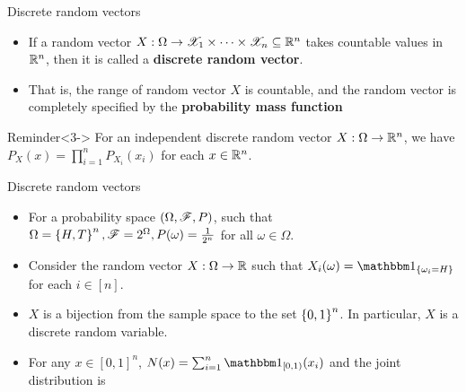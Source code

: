 \documentclass[12pt,aspectratio=169]{beamer}
\begin{document}
\begin{frame}{Discrete random vectors}
\begin{Definition}
\begin{itemize}
    \item <1-> If a random vector $X: \Omega \to \mathscr{X}_1 \times \dots  \times \mathscr{X}_n    \subseteq \mathbb{R}^n$ 
        takes countable values in $\mathbb{R}^n$, 
        then it is called a \textbf{discrete random vector}.
    \item <2-> That is, the range of random vector $X$ is countable,
        and the random vector is completely specified by the \textbf{probability mass function}
\end{itemize}
\end{Definition}
\begin{block}{Reminder}<3->
For an independent discrete random vector $X: \Omega \to \mathbb{R}^n$, we have $P_X(x) = \prod_{i=1}^nP_{X_i}(x_i)$ for each $x \in \mathbb{R}^n$. 
\end{block}
\end{frame}
\begin{frame}{Discrete random vectors}
\begin{Example} 
\begin{itemize}
\item <1-> For a probability space $(\Omega, \mathscr{F}, P)$, such that $\Omega = \left\{H,T\right\}^n, \mathscr{F} = 2^\Omega, P(\omega) = \frac{1}{2^n}$ for all $\omega \in \Omega$.  
\item <2-> Consider the random vector $X: \Omega \to \mathbb{R}$ such that $X_i(\omega) = \SetIn{\omega_i = H}$ for each $i \in [n]$. 
\item <3-> $X$ is a bijection from the sample space to the set $\left\{0,1\right\}^n$. 
In particular, $X$ is a discrete random variable. 
\item <4-> For any $x \in [0,1]^n$, $N(x) = \sum_{i=1}^n\Ind{[0,1)}(x_i)$ and the joint distribution is 
\end{itemize}
\end{Example}
\end{frame}
\end{document}
